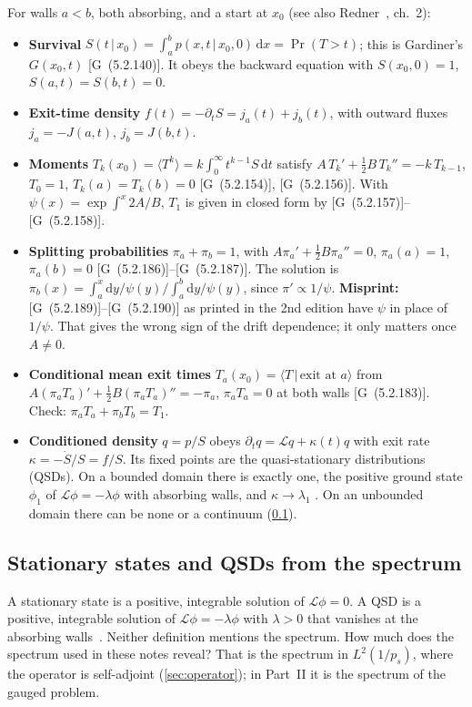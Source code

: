 \documentclass[11pt]{article}
\numberwithin{equation}{section}
\newcommand{\dd}{\mathrm{d}}
\newcommand{\avg}[1]{\langle #1\rangle}
\newcommand{\given}{\,|\,}
\newcommand{\G}[1]{[G~(#1)]}
\begin{document}
For walls $a<b$, both absorbing, and a start at $x_0$ (see also Redner~\cite{redner}, ch.~2):
\begin{itemize}
  \item \textbf{Survival} $S(t\given x_0)=\int_a^b p(x,t\given x_0,0)\,\dd x=\Pr(T>t)$; this is Gardiner's
        $G(x_0,t)$ \G{5.2.140}. It obeys the backward equation with $S(x_0,0)=1$, $S(a,t)=S(b,t)=0$.
  \item \textbf{Exit-time density} $f(t)=-\partial_tS = j_a(t)+j_b(t)$, with outward fluxes
        $j_a=-J(a,t)$, $j_b=J(b,t)$.
  \item \textbf{Moments} $T_k(x_0)=\avg{T^k}=k\int_0^\infty t^{k-1}S\,\dd t$ satisfy
        $A\,T_k'+\tfrac12B\,T_k''=-k\,T_{k-1}$, $T_0=1$, $T_k(a)=T_k(b)=0$ \G{5.2.154}, \G{5.2.156}.
        With $\psi(x)=\exp\int^x 2A/B$, $T_1$ is given in closed form by \G{5.2.157}--\G{5.2.158}.
  \item \textbf{Splitting probabilities} $\pi_a+\pi_b=1$, with $A\pi_a'+\tfrac12B\pi_a''=0$, $\pi_a(a)=1$,
        $\pi_a(b)=0$ \G{5.2.186}--\G{5.2.187}. The solution is
        $\pi_b(x)=\int_a^x\dd y/\psi(y)\big/\int_a^b\dd y/\psi(y)$, since $\pi'\propto1/\psi$.
        \textbf{Misprint:} \G{5.2.189}--\G{5.2.190} as printed in the 2nd edition have $\psi$ in place of
        $1/\psi$. That gives the wrong sign of the drift dependence; it only matters once $A\neq0$.
  \item \textbf{Conditional mean exit times} $T_a(x_0)=\avg{T\given\text{exit at }a}$ from
        $A(\pi_aT_a)'+\tfrac12B(\pi_aT_a)''=-\pi_a$, $\pi_aT_a=0$ at both walls \G{5.2.183}. Check:
        $\pi_aT_a+\pi_bT_b=T_1$.
  \item \textbf{Conditioned density} $q=p/S$ obeys $\partial_tq=\mathcal Lq+\kappa(t)q$ with exit rate
        $\kappa=-\dot S/S=f/S$. Its fixed points are the quasi-stationary distributions (QSDs). On a bounded
        domain there is exactly one, the positive ground state $\phi_1$ of $\mathcal L\phi=-\lambda\phi$ with
        absorbing walls, and $\kappa\to\lambda_1$ \cite{collet}. On an unbounded domain there can be none or
        a continuum (\cref{sec:spectrum-states}).
\end{itemize}

\subsection{Stationary states and QSDs from the spectrum}
\label{sec:spectrum-states}

A stationary state is a positive, integrable solution of $\mathcal L\phi=0$. A QSD is a positive, integrable
solution of $\mathcal L\phi=-\lambda\phi$ with $\lambda>0$ that vanishes at the absorbing walls~\cite{collet}.
Neither definition mentions the spectrum. How much does the spectrum used in these notes reveal? That is the
spectrum in $L^2(1/p_s)$, where the operator is self-adjoint (\cref{sec:operator}); in Part~II it is the
spectrum of the gauged problem.
\end{document}
